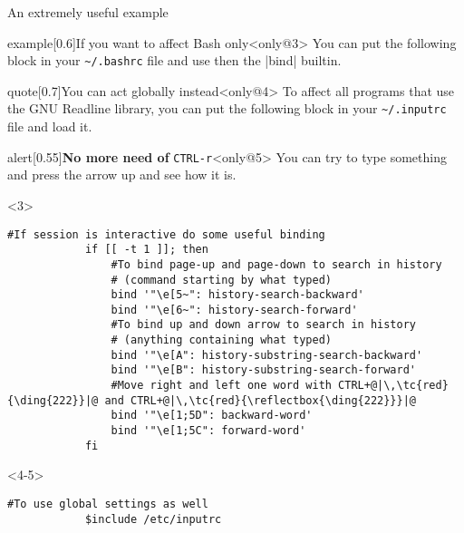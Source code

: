 \begin{frame}[fragile]{An extremely useful example}
    \begin{overlayarea}{\textwidth}{0.16\textheight}
        \vspace{-3mm}
        \begin{varblock}{example}[0.6\textwidth]{If you want to affect Bash only}<only@3>
            You can put the following block in your \texttt{\textasciitilde/.bashrc} file and use then the \bash|bind| builtin.
        \end{varblock}
        \begin{varblock}{quote}[0.7\textwidth]{You can act globally instead}<only@4>
            \textnormal{To affect all programs that use the GNU Readline library, you can put the following block in your \texttt{\textasciitilde/.inputrc} file and load it.}
        \end{varblock}
        \begin{varblock}{alert}[0.55\textwidth]{\textbf{No more need of} \texttt{CTRL-r}}<only@5>
            You can try to type something and press the arrow up and see how it is.
        \end{varblock}
    \end{overlayarea}
    \begin{onlyenv}<3>
        \begin{lstlisting}[style=myBash, numbers=none]
            #If session is interactive do some useful binding
            if [[ -t 1 ]]; then
                #To bind page-up and page-down to search in history
                # (command starting by what typed)
                bind '"\e[5~": history-search-backward'
                bind '"\e[6~": history-search-forward'
                #To bind up and down arrow to search in history
                # (anything containing what typed)
                bind '"\e[A": history-substring-search-backward'
                bind '"\e[B": history-substring-search-forward'
                #Move right and left one word with CTRL+@|\,\tc{red}{\ding{222}}|@ and CTRL+@|\,\tc{red}{\reflectbox{\ding{222}}}|@
                bind '"\e[1;5D": backward-word'
                bind '"\e[1;5C": forward-word'
            fi
        \end{lstlisting}
    \end{onlyenv}
    \begin{onlyenv}<4-5>
        \begin{lstlisting}[style=myBash, numbers=none, commentstyle=\color{Gray}]
            #To use global settings as well
            $include /etc/inputrc


\end{lstlisting}
\end{onlyenv}
\end{frame}
